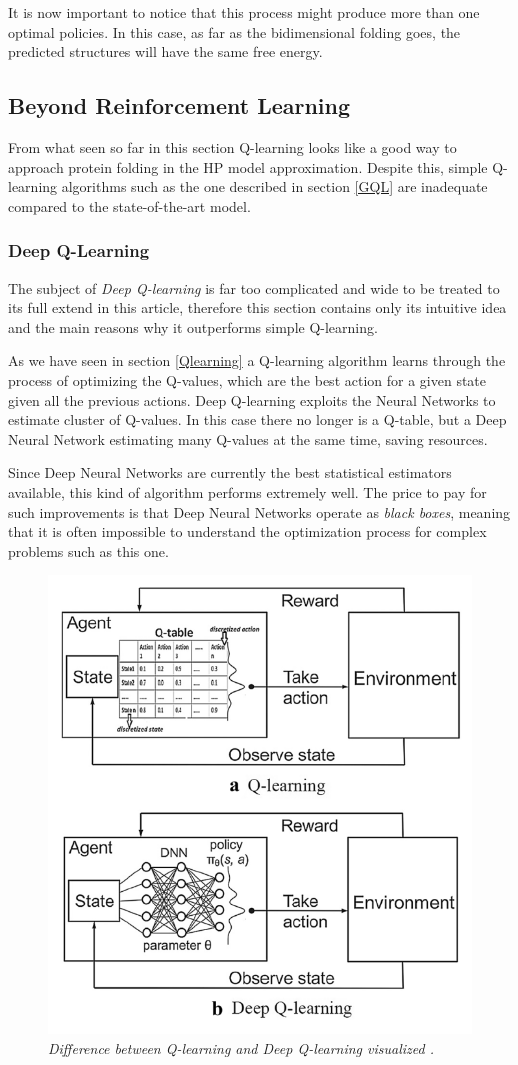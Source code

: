 It is now important to notice that this process might produce more than one optimal policies.
In this case, as far as the bidimensional folding goes, the predicted structures will have the same free energy.

\subsection{Beyond Reinforcement Learning}

From what seen so far in this section Q-learning looks like a good way to approach protein folding in the HP model approximation.
Despite this, simple Q-learning algorithms such as the one described in section \ref{GQL} are inadequate compared to the state-of-the-art model.

\subsubsection{Deep Q-Learning}

The subject of \emph{Deep Q-learning} is far too complicated and wide to be treated to its full extend in this article, therefore this section contains only its intuitive idea and the main reasons why it outperforms simple Q-learning.

As we have seen in section \ref{Qlearning} a Q-learning algorithm learns through the process of optimizing the Q-values, which are the best action for a given state given all the previous actions.
Deep Q-learning exploits the Neural Networks to estimate cluster of Q-values.
In this case there no longer is a Q-table, but a Deep Neural Network estimating many Q-values at the same time, saving resources. 

Since Deep Neural Networks are currently the best statistical estimators available, this kind of algorithm performs extremely well.
The price to pay for such improvements is that Deep Neural Networks operate as \textit{black boxes}, meaning that it is often impossible to understand the optimization process for complex problems such as this one.

\begin{figure}[H]
    \centering
    \includegraphics[width=.75\textwidth]{img/rl2.png}
    \caption{\emph{Difference between Q-learning and Deep Q-learning visualized \cite{jafari2020solving}.}}
    \label{fig:rl2}
\end{figure}